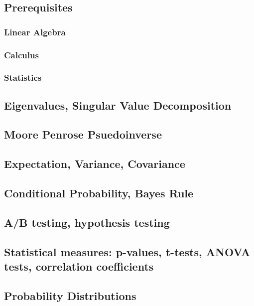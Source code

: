 %
%


\subsection{Prerequisites}
  \subsubsection{Linear Algebra}
  \subsubsection{Calculus}
  \subsubsection{Statistics}

\subsection{Eigenvalues, Singular Value Decomposition}

\subsection{Moore Penrose Psuedoinverse}

\subsection{Expectation, Variance, Covariance}

\subsection{Conditional Probability, Bayes Rule}

\subsection{A/B testing, hypothesis testing}

\subsection{Statistical measures: p-values, t-tests, ANOVA tests, correlation
              coefficients}

\subsection{Probability Distributions}


